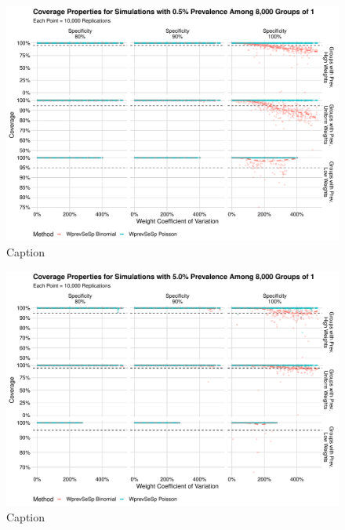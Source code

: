 \documentclass[AMA,STIX1COL]{WileyNJD-v2}
\begin{document}
\begin{figure}
    \centering
    \includegraphics[width=\textwidth]{figures/imperfect_coverage_8000_0_005_reduced.pdf}
    \caption{Caption}
    \label{fig:imperfect_coverage_8000_0_005_reduced}
\end{figure}

\begin{figure}
    \centering
    \includegraphics[width=\textwidth]{figures/imperfect_coverage_8000_0_05_reduced.pdf}
    \caption{Caption}
    \label{fig:imperfect_coverage_8000_0_05_reduced.pdf}
\end{figure}
\end{document}
